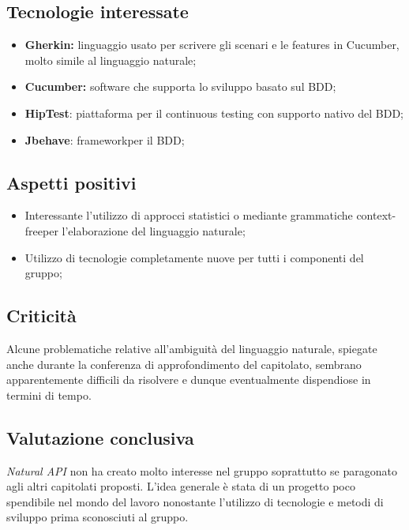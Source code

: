 \subsection{Tecnologie interessate}
\begin{itemize}
	\item \textbf{Gherkin:} linguaggio usato per scrivere gli scenari e le features in Cucumber, molto simile al linguaggio naturale; 
	\item \textbf{Cucumber:} software che supporta lo sviluppo basato sul BDD\glos;
	\item \textbf{HipTest}: piattaforma per il continuous testing con supporto nativo del BDD\glos;
	\item \textbf{Jbehave}: framework\glo per il BDD\glos;
\end{itemize}

\subsection{Aspetti positivi}

\begin{itemize}
	\item Interessante l'utilizzo di approcci statistici o mediante grammatiche context-free\glo per l'elaborazione del linguaggio naturale;
	\item Utilizzo di tecnologie completamente nuove per tutti i componenti del gruppo;
\end{itemize}


\subsection{Criticità}
Alcune problematiche relative all'ambiguità del linguaggio naturale, spiegate anche durante la conferenza di approfondimento del capitolato\glos, sembrano apparentemente difficili da risolvere e dunque eventualmente dispendiose in termini di tempo.


\subsection{Valutazione conclusiva}
\textit{Natural API} non ha creato molto interesse nel gruppo soprattutto se paragonato agli altri capitolati proposti. L'idea generale è stata di un progetto poco spendibile nel mondo del lavoro nonostante l'utilizzo di tecnologie e metodi di sviluppo prima sconosciuti al gruppo.
